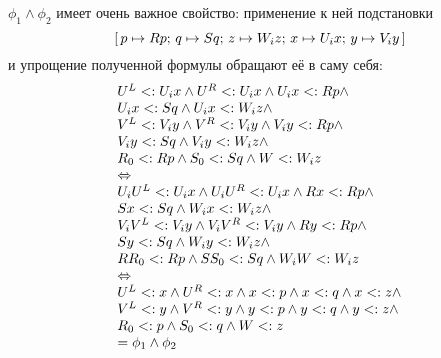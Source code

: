 $\phi_{1} \land \phi_{2}$ имеет очень важное свойство: применение к ней подстановки 
\[
    \textrm{[} \, p \mapsto {R}p; \, q \mapsto {S}q; \,
    z \mapsto {W}_{i}z; \,
    x \mapsto {U}_{i}x; \,
    y \mapsto {V}_{i}y \, \textrm{]}
\]
и упрощение полученной формулы обращают её в саму себя:
\[
    \begin{array}{l}
    {U}^{L} <: {U}_{i}x \land
    {U}^{R} <: {U}_{i}x \land
    {U}_{i}x <: {R}p \land \\
    {U}_{i}x <: {S}q \land {U}_{i}x <: {W}_{i}z \land \\
    {V}^{L} <: {V}_{i}y \land
    {V}^{R} <: {V}_{i}y \land
    {V}_{i}y <: {R}p \land \\
    {V}_{i}y <: {S}q \land {V}_{i}y <: {W}_{i}z \land \\
    {R}_{0} <: {R}p \land {S}_{0} <: {S}q \land {W} <: {W}_{i}z \\
    \Leftrightarrow \\
    {U}_{i}{U}^{L} <: {U}_{i}x \land {U}_{i}{U}^{R} <: {U}_{i}x \land {R}x <: {R}p \land \\
    {S}x <: {S}q \land {W}_{i}x <: {W}_{i}z \land \\
    {V}_{i}{V}^{L} <: {V}_{i}y \land {V}_{i}{V}^{R} <: {V}_{i}y \land {R}y <: {R}p \land \\
    {S}y <: {S}q \land {W}_{i}y <: {W}_{i}z \land \\
    {R}{R}_{0} <: {R}p \land {S}{S}_{0} <: {S}q \land {W}_{i}{W} <: {W}_{i}z \\
    \Leftrightarrow \\
    {U}^{L} <: x \land {U}^{R} <: x \land x <: p \land x <: q \land x <: z \land \\
    {V}^{L} <: y \land {V}^{R} <: y \land y <: p \land y <: q \land y <: z \land \\
    {R}_{0} <: p \land {S}_{0} <: q \land {W} <: z \\
    = \phi_{1} \land \phi_{2}
    \end{array}
\]
